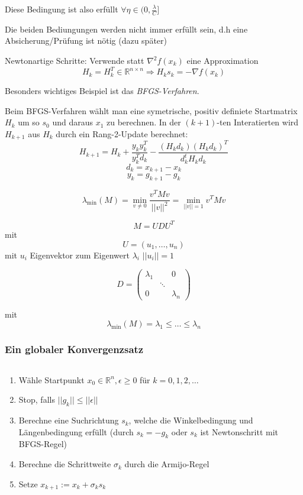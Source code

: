 \documentclass[10pt,a4paper]{article}
\begin{document}
Diese Bedingung ist also erfüllt $\forall \eta \in (0,\frac{\lambda}{C}]$

Die beiden Bediungungen werden nicht immer erfüllt sein, d.h eine Absicherung/Prüfung ist nötig (dazu später)



Newtonartige Schritte:
Verwende statt $\nabla^{2}f(x_k)$ eine Approximation $$H_k = H_k^{T} \in \mathbb{R}^{n \times n} \Rightarrow H_k s_k = - \nabla f(x_k)$$

Besonders wichtiges Beispiel ist das \emph{BFGS-Verfahren}.

Beim BFGS-Verfahren wählt man eine symetrische, positiv definiete Startmatrix $H_k$ um so $s_0$ und daraus $x_1$ zu berechnen. In der $(k+1)$-ten Interatierten wird $H_{k+1}$ aus $H_k$ durch ein Rang-2-Update berechnet: $$H_{k+1}=H_k + \frac{y_k y_k^{T}}{y_k^{T} d_k} - \frac{(H_k d_k)(H_k d_k)^{T}}{d_k^{t}H_k d_k}$$ $$d_k = x_{k+1}-x_k$$ $$  y_k=g_{k+1}-g_k$$



$$\lambda_{\min} (M)= \min\limits_{v \not= 0} \frac{v^{T}Mv}{||v||^{2}}=\min\limits_{||v||=1} v^{T}Mv$$

$$M=UDU^{T}$$ mit $$U=(u_1,\ldots,u_n)$$ mit  $u_i$ Eigenvektor zum Eigenwert $\lambda_i$ $||u_i||=1$

$$D=\begin{pmatrix}
\lambda_1 & & 0\\ & \ddots & \\ 0 & & \lambda_n
\end{pmatrix}$$


mit $$\lambda_{\min}(M)= \lambda_1 \leq \ldots \leq \lambda_n$$ 


\subsubsection{Ein globaler Konvergenzsatz}

\begin{bsp}

$$ $$
\begin{enumerate}
\item Wähle Startpunkt $x_0 \in \mathbb{R}^{n}, \epsilon \geq 0$ für $k=0,1,2, \ldots$
\item Stop, falls $||g_k|| \leq ||\epsilon||$
\item Berechne eine Suchrichtung $s_k$, welche die Winkelbedingung und Längenbedingung erfüllt (durch $s_k=-g_k$ oder $s_k$ ist Newtonschritt mit BFGS-Regel)
\item Berechne die Schrittweite $\sigma_k$ durch die Armijo-Regel
\item Setze $x_{k+1}:= x_k + \sigma_k s_k$
\end{enumerate}

\end{bsp}
\end{document}

